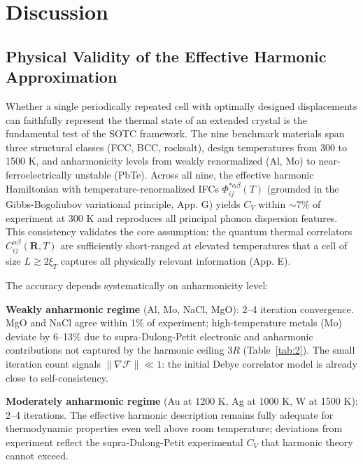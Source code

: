 \documentclass[aps,prb,reprint,amsmath,amssymb,floatfix]{revtex4-2}
\begin{document}
\section{Discussion}\label{discussion}

\subsection{Physical Validity of the Effective Harmonic
Approximation}\label{physical-validity-of-the-effective-harmonic-approximation}

Whether a single periodically repeated cell with optimally designed
displacements can faithfully represent the thermal state of an extended
crystal is the fundamental test of the SOTC framework. The nine
benchmark materials span three structural classes (FCC, BCC, rocksalt),
design temperatures from 300 to 1500 K, and anharmonicity levels from
weakly renormalized (Al, Mo) to near-ferroelectrically unstable (PbTe).
Across all nine, the effective harmonic Hamiltonian with
temperature-renormalized IFCs \(\Phi_{ij}^{*\alpha\beta}(T)\)
(grounded in the Gibbs-Bogoliubov variational principle, App. G)
yields \(C_V\) within $\sim$7\% of experiment at 300 K and reproduces
all principal phonon dispersion features. This consistency validates the
core assumption: the quantum thermal correlators
\(C_{ij}^{\alpha\beta}(\mathbf{R},T)\) are sufficiently short-ranged at
elevated temperatures that a cell of size \(L \gtrsim 2\xi_T\) captures
all physically relevant information (App. E).

The accuracy depends systematically on anharmonicity level:

\textbf{Weakly anharmonic regime} (Al, Mo, NaCl, MgO): 2--4 iteration
convergence. MgO and NaCl agree within 1\% of experiment;
high-temperature metals (Mo) deviate by 6--13\% due to supra-Dulong-Petit
electronic and anharmonic contributions not captured by the harmonic
ceiling $3R$ (Table~\ref{tab:2}). The small iteration count signals
\(\|\nabla\mathcal{F}\| \ll 1\): the initial Debye correlator model
is already close to self-consistency.

\textbf{Moderately anharmonic regime} (Au at 1200 K, Ag at 1000 K, W at
1500 K): 2--4 iterations. The effective harmonic description remains
fully adequate for thermodynamic properties even well above room
temperature; deviations from experiment reflect the supra-Dulong-Petit
experimental $C_V$ that harmonic theory cannot exceed.
\end{document}
